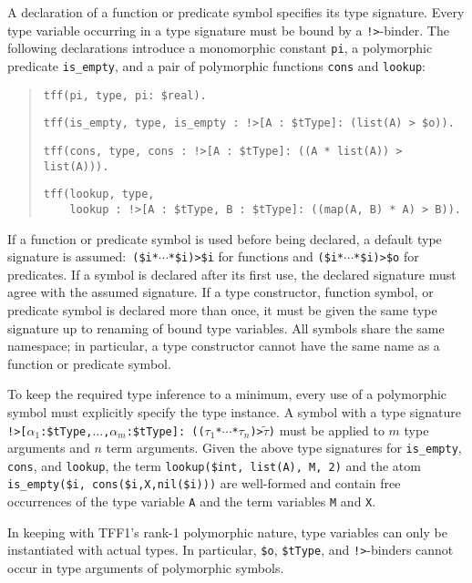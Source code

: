 A declaration of a function or predicate symbol specifies its type signature.
Every type variable occurring in a type signature must be bound by a
{\tt !>}-binder.
The following declarations introduce a monomorphic
constant {\tt pi}, a polymorphic predicate
{\tt is\_empty}, and a pair of polymorphic functions {\tt cons} and {\tt lookup}:
\begin{quote}
\verb+tff(pi, type, pi: $real).+
\par
\verb+tff(is_empty, type, is_empty : !>[A : $tType]: (list(A) > $o)).+\kern-10mm
\par
\pagebreak[2] %
\verb+tff(cons, type, cons : !>[A : $tType]: ((A * list(A)) > list(A))).+
\par
\pagebreak[2] %
\verb+tff(lookup, type,+\\
\verb+    lookup : !>[A : $tType, B : $tType]: ((map(A, B) * A) > B)).+\kern-10mm
\end{quote}
If a function or predicate symbol is used before being declared, a
default type signature is assumed:\ {\tt (\$i\;*\;${\cdots}$\;*\;\$i)\;>\;\$i}
for functions and {\tt (\$i\;*\;${\cdots}$\;*\;\$i)\;>\;\$o} for predicates.
If a symbol is declared after its first use, the declared signature
must agree with the assumed signature.
%
If a type constructor, function symbol, or predicate symbol is declared more
than once, it must be given the same type signature up to renaming of bound
type variables.
All symbols share the same namespace; in particular, a type constructor
cannot have the same name as a function or predicate symbol.

 To keep the required type
inference to a minimum, every use of a polymorphic symbol must explicitly
specify the type instance. A symbol with a type signature
{{\tt !>[$\alpha_1$\;:\;\$tType,\;${\dots}$,\;$\alpha_m$\;:\;\$tType]:\;%
(($\tau_1$\;*\;${\cdots}$\;*\;$\tau_n$)\;>\;$\tilde \tau$)}}
must be applied to $m$ type arguments and $n$ term arguments. Given the above
type signatures for {\tt is\_empty}, {\tt cons}, and {\tt lookup}, the term
\hbox{\tt lookup(\$int,\;\,list(A),\;\,M,\;\,2)}
and the atom
\hbox{\tt is\_empty(\$i,\;\,cons(\$i,\;X,\;nil(\$i)))}
are well-formed and contain free occurrences of the type variable {\tt A}
and the term variables {\tt M} and {\tt X}.

In keeping with TFF1's rank-1 polymorphic nature, type variables can only be
instantiated with actual types. In particular, \verb+$o+, \verb+$tType+,
and {\tt !>}-binders cannot occur in type arguments of polymorphic symbols.


